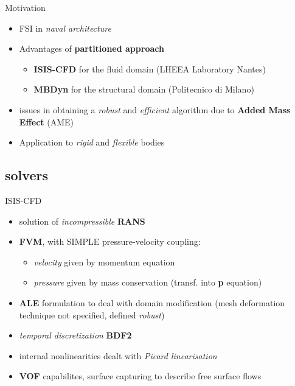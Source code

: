 \documentclass{beamer}
\begin{document}
\begin{frame}{Motivation}

\begin{itemize}
    \item FSI in \textit{naval architecture}
    \item Advantages of \textbf{partitioned approach}
    \begin{itemize}
        \item \textbf{ISIS-CFD} for the fluid domain (LHEEA Laboratory Nantes)
        \item \textbf{MBDyn} for the structural domain (Politecnico di Milano)
    \end{itemize}
    \item issues in obtaining a \textit{robust} and \textit{efficient} algorithm due to \textbf{Added Mass Effect} (AME)
    \item Application to \textit{rigid} and \textit{flexible} bodies
\end{itemize}
    
\end{frame}


\subsection{solvers}

\begin{frame}{ISIS-CFD}
    \begin{itemize}
        \item solution of \textit{incompressible} \textbf{RANS}
        \item \textbf{FVM}, with SIMPLE pressure-velocity coupling:
        \begin{itemize}
            \item \textit{velocity} given by momentum equation
            \item \textit{pressure} given by mass conservation (transf. into \textbf{p} equation)
        \end{itemize}
        \item \textbf{ALE} formulation to deal with domain modification (mesh deformation technique not specified, defined \textit{robust})
        \item \textit{temporal discretization} \textbf{BDF2}
        \item internal nonlinearities dealt with \textit{Picard linearisation}
        \item \textbf{VOF} capabilites, surface capturing to describe free surface flows
        
     
    \end{itemize}
\end{frame}
\end{document}
